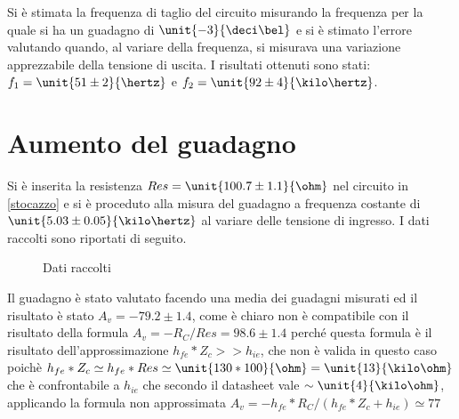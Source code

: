 \documentclass[10pt,a4paper]{article}
\begin{document}
Si è stimata la frequenza di taglio del circuito misurando la frequenza per la quale si ha un guadagno di $\unit{-3}{\deci\bel}$ e si è stimato l'errore valutando quando, al variare della frequenza, si misurava una variazione apprezzabile della tensione di uscita.
I risultati ottenuti sono stati: $f_1 = \unit{51 \pm 2}{\hertz}$ e $f_2= \unit{92 \pm 4}{\kilo\hertz}$.



\section{Aumento del guadagno}

Si è inserita la resistenza $Res = \unit{100.7 \pm 1.1}{\ohm}$ nel circuito in \figurename{\ref{stocazzo}} e si è proceduto alla misura del guadagno a frequenza costante di $\unit{5.03 \pm 0.05}{\kilo\hertz}$ al variare delle tensione di ingresso. I dati raccolti sono riportati di seguito.

\begin{figure}[h!]
	\centering
		
	\caption{Dati raccolti}
\end{figure}

Il guadagno è stato valutato facendo una media dei guadagni misurati ed il risultato è stato $A_v = -79.2 \pm 1.4$, come è chiaro non è compatibile con il risultato della formula $A_v = -R_C/Res = 98.6 \pm 1.4$ perché questa formula è il risultato dell'approssimazione $h_{fe}*Z_c >> h_{ie}$, che non è valida in questo caso poichè $h_{fe} * Z_c \simeq h_{fe} * Res \simeq \unit{130 * 100}{\ohm} = \unit{13}{\kilo\ohm} $ che è confrontabile a $h_{ie}$ che secondo il datasheet vale $\sim \unit{4}{\kilo\ohm}$, applicando la formula non approssimata $A_v = -h_{fe}*R_C/(h_{fe}*Z_c + h_{ie}) \simeq 77$
\end{document}
